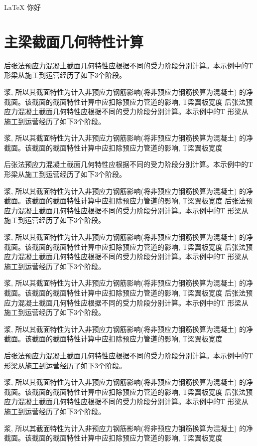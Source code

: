\documentclass{article}
\begin{document}
\LaTeX{}
你好
\section{主梁截面几何特性计算}

后张法预应力混凝土截面几何特性应根据不同的受力阶段分别计算。本示例中的T
形梁从施工到运营经历了如下3个阶段。

  浆, 所以其截面特性为计入非预应力钢筋影响(将非预应力钢筋换算为混凝土)
  的净截面。该截面的截面特性计算中应扣除预应力管道的影响, T梁翼板宽度
后张法预应力混凝土截面几何特性应根据不同的受力阶段分别计算。本示例中的T
形梁从施工到运营经历了如下3个阶段。

  浆, 所以其截面特性为计入非预应力钢筋影响(将非预应力钢筋换算为混凝土)
  的净截面。该截面的截面特性计算中应扣除预应力管道的影响, T梁翼板宽度

后张法预应力混凝土截面几何特性应根据不同的受力阶段分别计算。本示例中的T
形梁从施工到运营经历了如下3个阶段。

  浆, 所以其截面特性为计入非预应力钢筋影响(将非预应力钢筋换算为混凝土)
  的净截面。该截面的截面特性计算中应扣除预应力管道的影响, T梁翼板宽度
后张法预应力混凝土截面几何特性应根据不同的受力阶段分别计算。本示例中的T
形梁从施工到运营经历了如下3个阶段。

  浆, 所以其截面特性为计入非预应力钢筋影响(将非预应力钢筋换算为混凝土)
  的净截面。该截面的截面特性计算中应扣除预应力管道的影响, T梁翼板宽度
后张法预应力混凝土截面几何特性应根据不同的受力阶段分别计算。本示例中的T
形梁从施工到运营经历了如下3个阶段。

  浆, 所以其截面特性为计入非预应力钢筋影响(将非预应力钢筋换算为混凝土)
  的净截面。该截面的截面特性计算中应扣除预应力管道的影响, T梁翼板宽度
后张法预应力混凝土截面几何特性应根据不同的受力阶段分别计算。本示例中的T
形梁从施工到运营经历了如下3个阶段。

  浆, 所以其截面特性为计入非预应力钢筋影响(将非预应力钢筋换算为混凝土)
  的净截面。该截面的截面特性计算中应扣除预应力管道的影响, T梁翼板宽度

后张法预应力混凝土截面几何特性应根据不同的受力阶段分别计算。本示例中的T
形梁从施工到运营经历了如下3个阶段。

  浆, 所以其截面特性为计入非预应力钢筋影响(将非预应力钢筋换算为混凝土)
  的净截面。该截面的截面特性计算中应扣除预应力管道的影响, T梁翼板宽度
后张法预应力混凝土截面几何特性应根据不同的受力阶段分别计算。本示例中的T
形梁从施工到运营经历了如下3个阶段。

  浆, 所以其截面特性为计入非预应力钢筋影响(将非预应力钢筋换算为混凝土)
  的净截面。该截面的截面特性计算中应扣除预应力管道的影响, T梁翼板宽度
\end{document}
